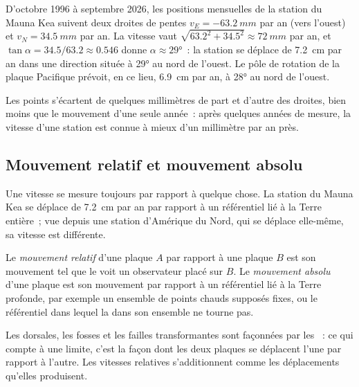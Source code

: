 \begin{example}\label{ex:g11:plate-motions:mkea}
D'octobre 1996 à septembre 2026, les positions mensuelles de la station du
Mauna Kea suivent deux droites de pentes $v_E =
\qty{-63.2}{mm}$ par an (vers l'ouest) et $v_N = \qty{+34.5}{mm}$ par an. La
vitesse vaut $\sqrt{63.2^2 + 34.5^2} \approx \qty{72}{mm}$ par an, et $\tan\alpha
= 34.5/63.2 \approx 0.546$ donne $\alpha \approx \ang{29}$~: la station se
déplace de \qty{7.2}{cm} par an dans une direction située à \ang{29} au nord
de l'ouest. Le pôle de rotation de la plaque Pacifique prévoit, en ce lieu,
\qty{6.9}{cm} par an, à \ang{28} au nord de l'ouest.
\end{example}

Les points s'écartent de quelques millimètres de part et d'autre des
droites, bien moins que le mouvement d'une seule année~: après quelques
années de mesure, la vitesse d'une station est connue à mieux d'un
millimètre par an près.

\subsection{Mouvement relatif et mouvement absolu}

Une vitesse se mesure toujours par rapport à quelque chose. La station du
Mauna Kea se déplace de \qty{7.2}{cm} par an par rapport à un référentiel
lié à la Terre entière~; vue depuis une station d'Amérique du Nord, qui se
déplace elle-même, sa vitesse est différente.

\begin{definition}\label{def:g11:plate-motions:relative-motion}
Le \emph{mouvement relatif} d'une plaque $A$ par
rapport à une plaque $B$ est son mouvement tel que le voit un observateur
placé sur $B$. Le \emph{mouvement absolu} d'une
plaque est son mouvement par rapport à un référentiel lié à la Terre
profonde, par exemple un ensemble de points chauds supposés fixes, ou le
référentiel dans lequel la  dans son ensemble ne tourne pas.
\end{definition}

Les dorsales, les fosses et les failles transformantes sont façonnées par
les ~: ce qui compte à une limite, c'est la façon dont
les deux plaques se déplacent l'une par rapport à l'autre. Les vitesses
relatives s'additionnent comme les déplacements qu'elles produisent.

